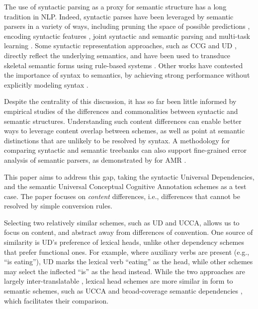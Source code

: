 \documentclass[11pt,a4paper]{article}
\begin{document}
  The use of syntactic parsing as a proxy for semantic structure has a long tradition in NLP.
  Indeed, syntactic parses have been leveraged by semantic parsers in a variety of ways,
  including pruning the space of possible predictions \cite{xue2004calibrating}, 
  encoding syntactic features \cite{gildea2002automatic,N15-1007,E17-1045}, 
  joint syntactic and semantic parsing \cite{surdeanu2008conll,hajivc2009conll} and
  multi-task learning \cite{strubell2018linguistically,swayamdipta2018syntactic}.
  Some syntactic representation approaches, such as CCG \cite{Steedman:00} and UD
  \citep{nivre2016universal}, directly reflect the underlying semantics, and have been used to
  transduce skeletal semantic forms using rule-based systems \cite{Basile:12,white2016universal,reddy2017universal}.
  Other works have contested the importance of syntax to semantics,
  by achieving strong performance without explicitly modeling syntax \cite{Peng-EtAl:2018:NAACL,P18-2077,P18-1192}.
    
  Despite the centrality of this discussion, it has so far been little informed by empirical studies of
  the differences and commonalities between syntactic and semantic structures.
  Understanding such content differences can enable better ways to leverage content overlap between schemes, 
  as well as point at semantic distinctions that are unlikely to be resolved by syntax.
  A methodology for comparing syntactic and semantic treebanks can also support fine-grained error 
  analysis of semantic parsers, as demonstrated by \citet{szubert2018structured} 
  for AMR \citep{banarescu2013abstract}.
   
   This paper aims to address this gap, taking the syntactic Universal Dependencies,
  and the semantic Universal Conceptual Cognitive Annotation \cite[UCCA; ][]{abend2013universal} schemes as a test case. 
  The paper focuses on {\it content} differences, i.e., differences that cannot be resolved by simple
  conversion rules. 
  
  Selecting two relatively similar schemes, such as UD and UCCA, allows
  us to focus on content, and abstract away from differences of convention.
  One source of similarity is UD's preference of lexical heads,
  unlike other dependency schemes that prefer functional ones.
  For example, where auxiliary verbs are present (e.g., ``is eating''), UD
  marks the lexical verb ``eating'' as the head, while other schemes
  may select the inflected ``is'' as the head instead.
  While the two approaches are largely inter-translatable
  \citep{Schwartz:12}, lexical head schemes are more similar in form to semantic schemes,
   such as UCCA and broad-coverage semantic dependencies \citep{oepen2016towards},
   which facilitates their comparison.
\end{document}
